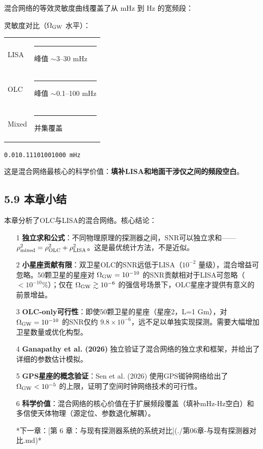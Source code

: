 \documentclass[12pt,a4paper]{article}
\begin{document}
混合网络的等效灵敏度曲线覆盖了从 mHz 到 Hz 的宽频段：

灵敏度对比（$\Omega_{\rm GW}$ 水平）：

\begin{center}
\begin{tabular}{l l}
LISA    & \rule{2.4em}{1em}\hspace{5.6em} 峰值 $\sim$3--30 mHz \\
OLC     & \hspace{1.8em}\rule{3.6em}{1em}\hspace{4.6em} 峰值 $\sim$0.1--100 mHz \\
Mixed   & \rule{4.2em}{1em}\hspace{4em} 并集覆盖 \\
\end{tabular}

\noindent\texttt{0.01\hspace{1.2em}0.1\hspace{1.5em}1\hspace{1.8em}10\hspace{1.8em}100\hspace{1.5em}1000 mHz}
\end{center}
这是混合网络最核心的科学价值：\textbf{填补LISA和地面干涉仪之间的频段空白}。

\subsection{5.9 本章小结}


本章分析了OLC与LISA的混合网络。核心结论：

\begin{itemize}
  \item[1] \textbf{独立求和公式}：不同物理原理的探测器之间，SNR可以独立求和——$\rho_{\rm mixed}^2 = \rho_{\rm OLC}^2 + \rho_{\rm LISA}^2$。这是最优统计方法，不是近似。

  \item[2] \textbf{小星座贡献有限}：双卫星OLC的SNR远低于LISA（$10^{-2}$ 量级），混合增益可忽略。50颗卫星的星座对 $\Omega_{\rm GW} = 10^{-10}$ 的SNR贡献相对于LISA可忽略（$< 10^{-10}\%$）；仅在 $\Omega_{\rm GW} \gtrsim 10^{-6}$ 的强信号场景下，OLC星座才提供有意义的前景增益。

  \item[3] \textbf{OLC-only可行性}：即使50颗卫星的星座（星座2，L=1 Gm），对 $\Omega_{\rm GW} = 10^{-10}$ 的SNR仅约 $9.8\times 10^{-6}$，远不足以单独实现探测。需要大幅增加卫星数量或优化构型。

  \item[4] \textbf{Ganapathy et al. (2026)} 独立验证了混合网络的独立求和框架，并给出了详细的参数估计模拟。

  \item[5] \textbf{GPS星座的概念验证}：Sen et al. (2026) 使用GPS铷钟网络给出了 $\Omega_{\rm GW} < 10^{-5}$ 的上限，证明了空间时钟网络技术的可行性。

  \item[6] \textbf{科学价值}：混合网络的核心价值在于扩展频段覆盖（填补mHz-Hz空白）和多信使天体物理（源定位、参数退化解耦）。


*下一章：[第 6 章：与现有探测器系统的系统对比](./第06章-与现有探测器对比.md)*

\end{itemize}
\end{document}
